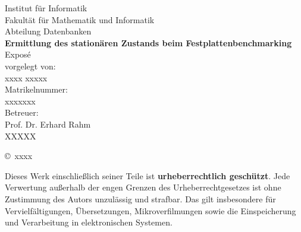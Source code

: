 \documentclass{article}
\newcommand{\titel}{Ermittlung des stationären Zustands beim Festplattenbenchmarking}
\newcommand{\art}{Exposé} %
\newcommand{\fachgebiet}{Abteilung Datenbanken}
\newcommand{\fakultaet}{Fakultät für Mathematik und Informatik}
\newcommand{\institut}{Institut für Informatik}
\newcommand{\autor}{xxxx xxxxx}
\newcommand{\matrikelnr}{xxxxxxx}
\newcommand{\erstbetreuer}{Prof. Dr. Erhard Rahm}
\newcommand{\zweitbetreuer}{XXXXX}
\newcommand{\jahr}{xxxx}
\begin{document}
\thispagestyle{plain}
\begin{titlepage}

\begin{center}

\institut\\
\fakultaet\\
\fachgebiet\\[6ex]

\textbf{\large\titel}\\[1.5ex]
\art\\[6ex]

\normalsize
vorgelegt von:\\
\autor\\[1.5ex]
Matrikelnummer:\\
\matrikelnr\\[1.5ex]
Betreuer:\\
\erstbetreuer\\
\zweitbetreuer\\[1.0ex]
\end{center}


\begin{center}
\copyright\ \jahr\\[1.0ex]
\end{center}

\singlespacing
\small
\noindent Dieses Werk einschließlich seiner Teile ist \textbf{urheberrechtlich geschützt}. Jede Verwertung außerhalb der engen Grenzen des Urheberrechtgesetzes ist ohne Zustimmung des Autors unzulässig und strafbar. Das gilt insbesondere für Vervielfältigungen, Übersetzungen, Mikroverfilmungen sowie die Einspeicherung und Verarbeitung in elektronischen Systemen.



\end{titlepage}


\tableofcontents{}


\newpage
\end{document}
